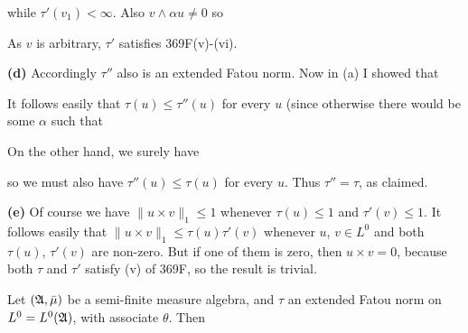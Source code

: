 {\noindent while $\tau'(v_1)<\infty$.   Also $v\wedge\alpha u\ne 0$ so
     
     
\noindent As $v$ is arbitrary, $\tau'$ satisfies 369F(v)-(vi).
     
\medskip
     
{\bf (d)} Accordingly $\tau''$ also is an extended Fatou norm.   Now in
(a) I showed that
     
     
\noindent It follows easily that $\tau(u)\le\tau''(u)$ for every $u$
(since otherwise there would be some $\alpha$ such that
     
     
\noindent On the other hand, we surely have
     
     
\noindent so we must also have $\tau''(u)\le\tau(u)$ for every $u$.
Thus $\tau''=\tau$, as claimed.
     
\medskip
     
{\bf (e)} Of course we have $\|u\times v\|_1\le 1$ whenever 
$\tau(u)\le 1$ and $\tau'(v)\le 1$.   It follows easily that 
$\|u\times v\|_1\le\tau(u)\tau'(v)$ whenever $u$, $v\in L^0$ and both $\tau(u)$, $\tau'(v)$ are non-zero.   But if one of them is zero, then $u\times v=0$,
because both $\tau$ and $\tau'$ satisfy (v) of 369F, so the result is
trivial.
}%
     
 Let $(\frak A,\bar\mu)$ be a semi-finite
measure algebra, and $\tau$ an extended Fatou norm on 
$L^0=L^0(\frak A)$, with associate $\theta$.   Then
     
     
     
